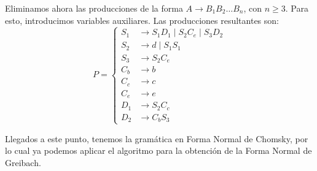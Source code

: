 \begin{ejercicio}
    Eliminamos ahora las producciones de la forma $A\to B_1B_2\ldots B_n$, con $n\geq 3$. Para esto, introducimos variables auxiliares. Las producciones resultantes son:
    \begin{equation*}
        P = \left\{
            \begin{aligned}
                S_1 &\rightarrow S_1 D_1 \mid S_2C_e \mid S_3 D_2 \\
                S_2 &\rightarrow d \mid S_1 S_1\\
                S_3 &\rightarrow S_2 C_e\\
                C_b &\rightarrow b\\
                C_c &\rightarrow c\\
                C_e &\rightarrow e \\
                D_1 &\rightarrow S_2 C_c \\
                D_2 &\rightarrow C_b S_3
            \end{aligned}
        \right.
    \end{equation*}
    
    Llegados a este punto, tenemos la gramática en Forma Normal de Chomsky, por lo cual ya podemos aplicar el algoritmo para la obtención de la Forma Normal de Greibach.
\end{ejercicio}

